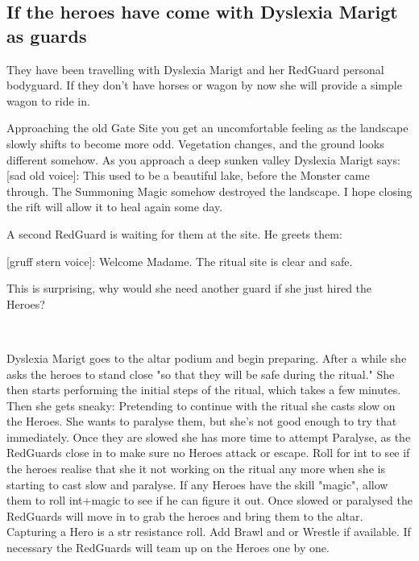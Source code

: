 \subsection*{If the heroes have come with Dyslexia Marigt as guards}
They have been travelling with Dyslexia Marigt and her RedGuard personal bodyguard. If they don't have horses or wagon by now she will provide a simple wagon to ride in.
\begin{readoutloud}
Approaching the old Gate Site you get an uncomfortable feeling as the landscape slowly shifts to become more odd. Vegetation changes, and the ground looks different somehow. As you approach a deep sunken valley Dyslexia Marigt says:\\

\textnormal{[sad old voice]:} This used to be a beautiful lake, before the Monster came through. The Summoning Magic somehow destroyed the landscape. I hope closing the rift will allow it to heal again some day.
\end{readoutloud}

A second RedGuard is waiting for them at the site. He greets them:
\begin{readoutloud}
\textnormal{[gruff stern voice]:} Welcome Madame. The ritual site is clear and safe.
\end{readoutloud}
This is surprising, why would she need another guard if she just hired the Heroes?

\

Dyslexia Marigt goes to the altar podium and begin preparing. After a while she asks the heroes to stand close "so that they will be safe during the ritual."
She then starts performing the initial steps of the ritual, which takes a few minutes. Then she gets sneaky: Pretending to continue with the ritual she casts slow on the Heroes. She wants to paralyse them, but she's not good enough to try that immediately. Once they are slowed she has more time to attempt Paralyse, as the RedGuards close in to make sure no Heroes attack or escape.
Roll for int to see if the heroes realise that she it not working on the ritual any more when she is starting to cast slow and paralyse. If any Heroes have the skill "magic", allow them to roll int+magic to see if he can figure it out.
Once slowed or paralysed the RedGuards will move in to grab the heroes and bring them to the altar. Capturing a Hero is a str resistance roll. Add Brawl and or Wrestle if available. If necessary the RedGuards will team up on the Heroes one by one.


